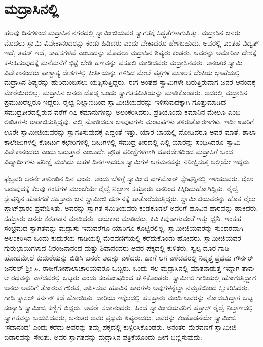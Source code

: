 
\chapter{ಮದ್ರಾಸಿನಲ್ಲಿ }

 ಹಲವು ದಿನಗಳಿಂದ ಮದ್ರಾಸಿನ ನಗರದಲ್ಲಿ ಸ್ವಾಮೀಜಿಯವರ ಸ್ವಾಗತಕ್ಕೆ ಸಿದ್ಧತೆಗಳಾಗುತ್ತಿತ್ತು. ಮದ್ರಾಸಿನ ಜನರು ಮೊದಲು ಸ್ವಾಮಿ ವಿವೇಕಾನಂದರನ್ನು ಕಂಡು ಹಿಡಿದರು ಎಂದು ಬೇಕಾದರೂ ಹೇಳಬಹುದು. ಅವರಲ್ಲಿ ಎಂತಹ ವಿದ್ವತ್ ಇದೆ, ತಪಸ್ ಇದೆ, ಸಾಹಸಗಳಿವೆ ಎಂಬುದನ್ನು ಮೊದಲು ಮದ್ರಾಸಿನ ಶಿಷ್ಯರು ಕಂಡರು. ಅವರನ್ನು ಅಮೇರಿಕಾ ದೇಶಕ್ಕೆ ಕಳುಹಿಸುವುದಕ್ಕೆ ಮನೆಮನೆಗೆ ಭಿಕ್ಷೆ ಬೇಡಿ ಹಣವನ್ನು ವಸೂಲಿ ಮಾಡಿದವರು ಮದ್ರಾಸಿನವರು. ಅನಂತರ ಸ್ವಾಮಿ ವಿವೇಕಾನಂದರು ಪಾಶ್ಚಾತ್ಯ ದೇಶಗಳಲ್ಲಿ ಕೀರ್ತಿಯನ್ನು ಗಳಿಸಿದ ಮೇಲೆ ಪತ್ರಗಳ ಮೂಲಕ ಬೆಂಕಿಯ ಭಾಷೆಯಲ್ಲಿ ಮದ್ರಾಸಿನ ಶಿಷ್ಯರನ್ನು ಹುರಿದುಂಬಿಸಲು ಯತ್ನಿಸುತ್ತಿದ್ದರು. ಈಗ ಅಂತಹ ಸ್ವಾಮಿಗಳೇ ಬರುತ್ತಿರುವಾಗ ಜನರ ಆನಂದಕ್ಕೆ ಮೇರೆಯಿರಲಿಲ್ಲ. ಮದ್ರಾಸಿನ ಜನರು ದೊಡ್ಡ ಒಂದು ಸ್ವಾಗತಸಮಿತಿಯನ್ನು ಮಾಡಿಕೊಂಡರು. ಅದರಲ್ಲಿ ಮದ್ರಾಸಿನ ಪ್ರಮುಖರೆಲ್ಲರೂ ಇದ್ದರು. ರೈಲ್ವೆ ನಿಲ್ದಾಣದಿಂದ ಸ್ವಾಮೀಜಿಯವರನ್ನು ಇಳಿಸುವುದಕ್ಕಾಗಿ ಗೊತ್ತುಮಾಡಿದ ಸಮುದ್ರತೀರದಲ್ಲಿರುವ  ವರೆಗೆ ೧೭ ಕಮಾನುಗಳನ್ನು ಅಲಂಕರಿಸಿದರು. ಪ್ರತಿಯೊಂದು ಕಮಾನಿನ ಮೇಲೂ  ಎಂಬ ಲಿಖಿತಗಳು ರಾರಾಜಿಸುತ್ತಿದ್ದವು. ಎಲ್ಲಿ ನೋಡಿದರೂ ಬಾವುಟಗಳು ಮಂಟಪಗಳು ತಳಿರುತೋರಣಗಳು. ಇಡೀ ಊರಿಗೆ ಊರೇ ಸ್ವಾಮೀಜಿಯವರನ್ನು ಸ್ವಾಗತಿಸುವುದಕ್ಕೆ ಎದ್ದಂತೆ ಇತ್ತು. ಯಾರ ಬಾಯಲ್ಲಿ ನೋಡಿದರೂ ಅವರ ಮಾತೆ. ಶಾಲಾ ಕಾಲೇಜುಗಳಲ್ಲಿ ಕೋರ್ಟು ಕಛೇರಿಗಳಲ್ಲಿ ಬೀದಿಗಳಲ್ಲಿ ಸಮುದ್ರ ತೀರದಲ್ಲಿ ಎಲ್ಲಿ ಯಾರನ್ನು ಸಂಧಿಸಿದರೂ ಸ್ವಾಮಿ ವಿವೇಕಾನಂದರು ಎಂದು ಬರುತ್ತಾರೆ ಎಂಬುದೇ. ಪ್ರೌಢ ಪರೀಕ್ಷೆಗಳಿಗಾಗಿ ದೂರದೇಶದಿಂದ ಮದ್ರಾಸಿಗೆ ಬಂದ ವಿದ್ಯಾರ್ಥಿಗಳು ಪರೀಕ್ಷೆ ಮುಗಿದು ಬಹಳ ದಿನಗಳಾದರೂ ಸ್ವಾಮಿಗಳ ಆಗಮನವನ್ನು ನಿರೀಕ್ಷಿಸುತ್ತ ಅಲ್ಲಿಯೇ ಇದ್ದರು. 

 ಫೆಬ್ರವರಿ ಆರನೇ ತಾರೀಖಿನ ದಿನ ಬಂತು. ಅಂದು ಬೆಳಿಗ್ಗೆ ಸ್ವಾಮೀಜಿ ಎಗ್‍ಮೋರ್ ಸ್ಟೇಷನ್ನಿನಲ್ಲಿ ಇಳಿಯುವರು. ರೈಲು ಬರುವುದಕ್ಕೆ ಕೆಲವು ಗಂಟೆಗಳ ಮುಂಚೆಯೇ ರೈಲ್ವೆ ನಿಲ್ದಾಣ ಸಹಸ್ರಾರು ಜನರಿಂದ ಕಿಕ್ಕಿರಿದುಹೋಗಿದ್ದಿತು. ರೈಲ್ವೆ ಸ್ಟೇಷನ್ನಿನ ಹೊರಗಡೆ ಸಹಸ್ರಾರು ಜನ ಸ್ವಾಮೀಜಿ ದರ್ಶನಕ್ಕೆ ಹಾತೊರೆಯುತ್ತಿದ್ದರು. ಸ್ವಾಮೀಜಿಯವರನ್ನು ಹೊತ್ತ ರೈಲು ಪ್ಲಾಟ್‍ಫಾರಂ ಪ್ರವೇಶಿಸಿತು. ಅವರನ್ನು ಸ್ವಾಗತ ಸಮಿತಿಯವರು ಕಂಡಕೂಡಲೆ ಅವರಿಗೆ ಹೂವಿನ ಹಾರವನ್ನು ಹಾಕಿದರು. ಸಹಸ್ರಾರು ಜನರು ಕರತಾಡನ ಮಾಡಿದರು. ಜಯಕಾರ ಮಾಡಿದರು, ಕಿವಿ ಕಿವುಡಾಗುವಂತೆ ಇತ್ತು ಧ್ವನಿ. ಇಂತಹ ಸಂಭ್ರಮದ ಸ್ವಾಗತವನ್ನು ಮದ್ರಾಸು ಇದುವರೆಗೂ ಯಾರಿಗೂ ಕೊಟ್ಟಿರಲಿಲ್ಲ. ಸ್ವಾಮೀಜಿಯವರನ್ನು ಸುಂದರವಾಗಿ ಅಲಂಕರಿಸಿದ ಒಂದು ಕುದುರೆಯ ಗಾಡಿಯಲ್ಲಿ ಮೆರವಣಿಗೆಯಲ್ಲಿ ಕರೆದುಕೊಂಡು ಹೋದರು. ಸ್ವಾಮೀಜಿಯವರ ಗುರುಭಾಯಿಗಳಾದ ನಿರಂಜನಾನಂದ ಮತ್ತು ಶಿವಾನಂದರು ಅವರ ಪಕ್ಕದಲ್ಲಿ ಕುಳಿತರು. ಸ್ವಲ್ಪ ದೂರ ಗಾಡಿ ಹೋದಮೇಲೆ ಕುದುರೆಯನ್ನು ಬಿಡಿಸಿ ಜನರೇ ಅದನ್ನು ಎಳೆದರು. ಹಾಗೆ ಆಗ ಎಳೆದವರಲ್ಲಿ ನಿವೃತ್ತ ಪ್ರಥಮ ಗೌರ್ನರ್ ಜನರಲ್ ಶ‍್ರೀ ಸಿ. ರಾಜಗೋಪಾಲಾಚಾರಿಯವರೂ ಒಬ್ಬರು. ಒಂದು ಸಲ ಮದ್ರಾಸಿನಲ್ಲಿ ಮಾತನಾಡುತ್ತ ಇದ್ದಾಗ ತಾವು ಆ ರಥವನ್ನು ಎಳೆದವರಲ್ಲಿ ಒಬ್ಬರು ಎಂದು ಸಂತೋಷದಿಂದ ಹೇಳಿಕೊಂಡರು. ಸ್ವಾಮೀಜಿ ಗಾಡಿಯಲ್ಲಿ ಹೋಗುತ್ತಿದ್ದಾಗ ಜನರು ಅವರಿಗೆ ತೋರುವ ಗೌರವ, ಅರ್ಪಿಸುವ ಹೂವಿನ ಹಾರಗಳು ಅವುಗಳನ್ನೆಲ್ಲಾ ನಮ್ರತೆಯಿಂದ ಸ್ವೀಕರಿಸಿದರು. ಗಾಡಿ ಕ್ಯಾಸಲ್ ಕರ್ನನ್ ಕಡೆ ಹೋಯಿತು. ದಾರಿಯ ಇಕ್ಕೆಲದಲ್ಲಿ ಹಸಹ್ರಾರು ಮಂದಿ ಅವರನ್ನು ನೋಡುತ್ತಿದ್ದಾಗ ಒಬ್ಬ ಸಂನ್ಯಾಸಿ ಸ್ವಾಮೀಜಿ ಕಣ್ಣಿಗೆ ಬಿದ್ದರು. ಅವರೇ ಸದಾನಂದರು. ಹಿಂದೆ ಸ್ವಾಮೀಜಿಯವರಿಗೆ ಹತ್ರಾಸ್ ರೈಲ್ವೆ ನಿಲ್ದಾಣದಲ್ಲಿ ಸ್ವಾಗತವನ್ನು ಬಯಸಿದವರು, ಅನಂತರ ಅವರ ಪ್ರಥಮ ಶಿಷ್ಯರಾದರು. ಅವರನ್ನು ಕಂಡೊಡನೆಯೇ ಸ್ವಾಮೀಜಿ ‘ಸದಾನಂದ’ ಎಂದು ಕರೆದು ಅವರನ್ನು ತಮ್ಮ ಪಕ್ಕದಲ್ಲಿ ಕುಳ್ಳಿರಿಸಿಕೊಂಡರು. ಅನಂತರ ಮೆರವಣಿಗೆ ಸ್ವಾಮೀಜಿ ಬಿಡಾರವನ್ನು ಸೇರಿತು. ಅವರ ಸ್ವಾಗತವನ್ನು ಮದ್ರಾಸಿನ ಪತ್ರಿಕೆಯೊಂದು ಹೀಗೆ ಬಣ್ಣಿಸುವುದು: 

